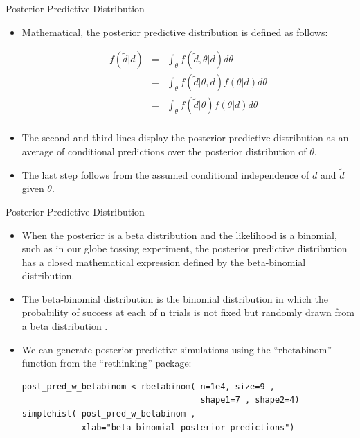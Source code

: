 \documentclass[handout]{beamer}
\begin{document}
\begin{frame}{Posterior Predictive Distribution}
\scriptsize{


\begin{itemize}
 
\item Mathematical, the posterior predictive distribution is defined as follows:

  \begin{eqnarray*}
 f(\tilde{d}|d) & = & \int_{\theta}f(\tilde{d},\theta|d)d\theta \\ 
                & = &  \int_{\theta}f(\tilde{d}|\theta,d)f(\theta|d)d\theta \\
                & = &  \int_{\theta}f(\tilde{d}|\theta)f(\theta|d)d\theta \\
 \end{eqnarray*}
 
 \item The second and third lines display the posterior predictive distribution as an average of conditional predictions over the posterior distribution of $\theta$.
 
 \item The last step follows from the assumed conditional independence of $d$ and $\tilde{d}$ given $\theta$.
 
 
 
\end{itemize}


} 
\end{frame}


\begin{frame}[fragile]{Posterior Predictive Distribution}
\scriptsize{


\begin{itemize}


\item When the posterior is a beta distribution and the likelihood is a binomial, such as in our globe tossing experiment, the posterior predictive distribution has a closed mathematical expression defined by the beta-binomial distribution.

\item The beta-binomial distribution is the binomial distribution in which the probability of success at each of n trials is not fixed but randomly drawn from a beta distribution \cite{wiki:Beta-binomial_distribution}.

\item We can generate posterior predictive simulations using the ``rbetabinom'' function from the ``rethinking'' package:

\begin{verbatim}
post_pred_w_betabinom <-rbetabinom( n=1e4, size=9 ,
                                    shape1=7 , shape2=4)
simplehist( post_pred_w_betabinom ,
            xlab="beta-binomial posterior predictions")
\end{verbatim}



\end{itemize}



}
\end{frame}
\end{document}

